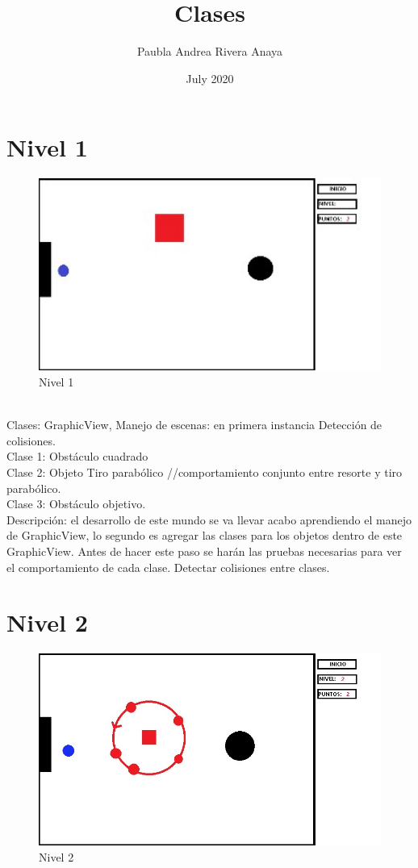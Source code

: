 \documentclass{article}
\title{Clases}
\author{Paubla Andrea Rivera Anaya }
\date{July 2020}
\begin{document}
\maketitle

\section{Nivel 1}

\begin{figure}[h!]
\centering
\includegraphics[width=1.1\textwidth]{1.jpg}
\caption{\label{fig1}Nivel 1}
\end{figure}
\\
Clases:
GraphicView, Manejo de escenas: en primera instancia 
Detección de colisiones.
\\
Clase 1: Obstáculo cuadrado 
\\
Clase 2: Objeto Tiro parabólico //comportamiento conjunto entre resorte y tiro parabólico.
\\
Clase 3: Obstáculo objetivo.
\\
Descripción: el desarrollo de este mundo se va llevar acabo aprendiendo el manejo de GraphicView, lo segundo es agregar las clases para los objetos dentro de este GraphicView. Antes de hacer este paso se harán las pruebas necesarias para ver el comportamiento de cada clase. Detectar colisiones entre clases.
\\
\section{Nivel 2}

\begin{figure}[h!]
\centering
\includegraphics[width=1.1\textwidth]{2.jpg}
\caption{\label{fig1}Nivel 2}
\end{figure}
\\
\end{document}
